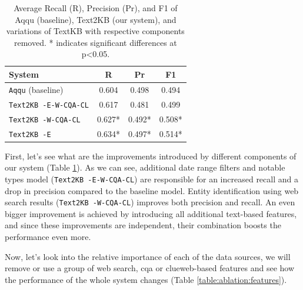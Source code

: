 \begin{table}
\caption{Average Recall (R), Precision (Pr), and F1 of Aqqu (baseline), Text2KB (our system), and variations of TextKB with respective components removed. * indicates significant differences at p<0.05. }
\label{table:ablation:entities_vs_features}
\begin{tabular}{| p{4cm} | c | c | c | }
\hline
System & R & Pr & F1 \\
\hline
\texttt{Aqqu} (baseline) & 0.604 & 0.498 & 0.494\\
\texttt{Text2KB -E-W-CQA-CL} & 0.617 & 0.481 & 0.499 \\
\texttt{Text2KB -W-CQA-CL} & 0.627* & 0.492* & 0.508* \\  %
\texttt{Text2KB -E} & 0.634* & 0.497* & 0.514* \\  %
\hline
\end{tabular}
\end{table}

First, let's see what are the improvements introduced by different components of our system (Table \ref{table:ablation:entities_vs_features}).
As we can see, additional date range filters and notable types model (\texttt{Text2KB -E-W-CQA-CL}) are responsible for an increased recall and a drop in precision compared to the baseline model.
Entity identification using web search results (\texttt{Text2KB -W-CQA-CL}) improves both precision and recall.
An even bigger improvement is achieved by introducing all additional text-based features, and since these improvements are independent, their combination boosts the performance even more.

Now, let's look into the relative importance of each of the data sources, we will remove or use a group of web search, cqa or clueweb-based features and see how the performance of the whole system changes (Table \ref{table:ablation:features}).


